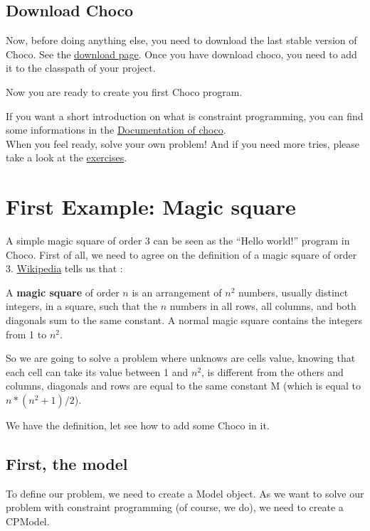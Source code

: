 \section{Download Choco}\label{gettingstarted:downloadchoco}\hypertarget{gettingstarted:downloadchoco}{}
Now, before doing anything else, you need to download the last stable version of Choco. See the \href{http://www.emn.fr/z-info/choco-solver/choco-download.html}{download page}. 
Once you have download choco, you need to add it to the classpath of your project.

Now you are ready to create you first Choco program.

If you want a short introduction on what is constraint programming, you can find some informations in the \href{http://www.emn.fr/z-info/choco-solver/choco-documentation.html}{Documentation of choco}.\\
When you feel ready, solve your own problem! And if you need more tries, please take a look at the \hyperlink{exercises}{exercises}. %

\chapter{First Example: Magic square}\label{gettingstarted:firstexample:magicsquare}\hypertarget{gettingstarted:firstexample:magicsquare}{}
A simple magic square of order 3 can be seen as the ``Hello world!'' program in Choco. First of all, we need to agree on the definition of a magic square of order 3.
\href{http://en.wikipedia.org/wiki/Magic_square}{Wikipedia} tells us that :
\begin{myquote}
A \textbf{magic square} of order $n$ is an arrangement of $n^2$ numbers, usually distinct integers, in a square, such that the $n$ numbers in all rows, all columns, and both diagonals sum to the same constant. A normal magic square contains the integers from 1 to $n^2$.
\end{myquote}

So we are going to solve a problem where unknows are cells value, knowing that each cell can take its value between 1 and $n^2$, is different from the others and columns, diagonals and rows are equal to the same constant M (which is equal to $n * (n^2 + 1) / 2$).

We have the definition, let see how to add some Choco in it.

\section{First, the model}\label{gettingstarted:first,themodel}\hypertarget{gettingstarted:first,themodel}{}
To define our problem, we need to create a Model object. As we want to solve our problem with constraint programming (of course, we do), we need to create a CPModel.


